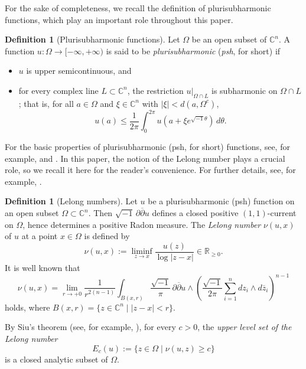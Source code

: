 \documentclass[12pt,twoside]{amsart}
\theoremstyle{definition}
\newtheorem{defn}[thm]{Definition}
\begin{document}
For the sake of completeness, we recall the definition of plurisubharmonic functions, which play an important role throughout this paper. 

\begin{defn}[Plurisubharmonic functions]\label{x-def5.1}
Let $\Omega$ be an open subset of $\mathbb C^n$. 
A function $u\colon \Omega \to [-\infty, +\infty)$ is said to be {\em plurisubharmonic} ({\em psh}, for short) if 
\begin{itemize}
\item[(1)] $u$ is upper semicontinuous, and 
\item[(2)] for every complex line $L \subset \mathbb C^n$, the restriction $u|_{\Omega \cap L}$ is subharmonic on $\Omega \cap L$; that is, for all $a \in \Omega$ and $\xi \in \mathbb C^n$ with $|\xi| < d(a, \Omega^c)$, 
\[
u(a) \leq \frac{1}{2\pi} \int_0^{2\pi} u(a+\xi e^{\sqrt{-1}\theta})\, d\theta.
\]
\end{itemize}
\end{defn}

For the basic properties of plurisubharmonic (psh, for short) functions, see, for 
example, \cite[1.B.~Plurisubharmonic Functions]{demailly1} and 
\cite[3.3~Plurisubharmonic Functions]{noguchi-ochiai}. 
In this paper, the notion of the Lelong number plays a crucial role, so we recall it here for the reader's convenience. 
For further details, see, for example, \cite[2.B.~Lelong Numbers]{demailly1}. 

\begin{defn}[Lelong numbers]\label{x-def5.2} 
Let $u$ be a plurisubharmonic (psh) function on an open subset $\Omega \subset \mathbb C^n$. 
Then $\sqrt{-1}\,\partial \overline\partial u$ defines a closed positive $(1,1)$-current on $\Omega$, hence determines a positive Radon measure. 
The {\em Lelong number} $\nu(u, x)$ of $u$ at a point $x \in \Omega$ is defined by
\[
\nu(u, x):= \liminf_{z\to x} \frac{u(z)}{\log |z-x|} \in \mathbb R_{\ge 0}.
\]
It is well known that
\begin{equation}\label{x-eq5.1}
\nu(u, x) = \lim_{r\to +0} \frac{1}{r^{2(n-1)}} 
\int_{B(x, r)} \frac{\sqrt{-1}}{\pi}\, \partial \overline\partial u 
\wedge \left( \frac{\sqrt{-1}}{2\pi} \sum_{i=1}^n dz_i \wedge d\overline z_i \right)^{n-1}
\end{equation} 
holds, 
where $B(x, r) = \{ z \in \mathbb C^n \mid |z-x| < r \}$.  

By Siu's theorem (see, for example, \cite[(13.3) Corollary]{demailly1}), 
for every $c > 0$, the {\em upper level set of the Lelong number}
\[
E_c(u) := \{ z \in \Omega \mid \nu(u, z) \ge c \}
\]
is a closed analytic subset of $\Omega$. 
\end{defn}
\end{document}
